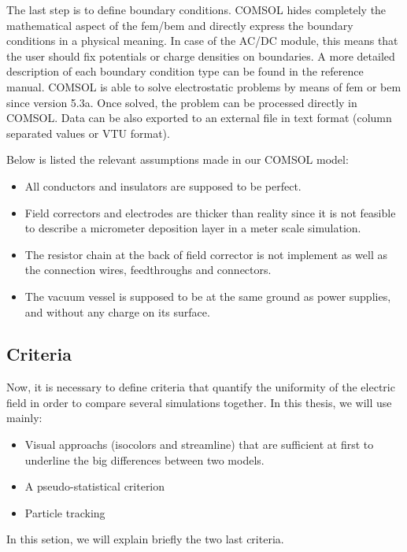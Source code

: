 \begin{refsection}
  

  The last step is to define boundary conditions. COMSOL hides completely the mathematical aspect of the \acrshort{fem}/\acrshort{bem} and directly express the boundary conditions in a physical meaning. In case of the AC/DC module, this means that the user should fix potentials or charge densities on boundaries. A more detailed description of each boundary condition type can be found in the reference manual. COMSOL is able to solve electrostatic problems by means of \acrshort{fem} or \acrshort{bem} since version 5.3a.
  Once solved, the problem can be processed directly in COMSOL. Data can be also exported to an external file in text format (column separated values or VTU format).

  

  Below is listed the relevant assumptions made in our COMSOL model:
  \begin{itemize}
  \item All conductors and insulators are supposed to be perfect. 
  \item Field correctors and electrodes are thicker than reality since it is not feasible to describe a micrometer deposition layer in a meter scale simulation. 
  \item The resistor chain at the back of field corrector is not implement as well as the connection wires, feedthroughs and connectors. 
  \item The vacuum vessel is supposed to be at the same ground as power supplies, and without any charge on its surface.
  \end{itemize}

  \subsection{Criteria}

  Now, it is necessary to define criteria that quantify the uniformity of the electric field in order to compare several simulations together. In this thesis, we will use mainly:
  \begin{itemize}
    \item Visual approachs (isocolors and streamline) that are sufficient at first to underline the big differences between two models.
    \item A pseudo-statistical criterion
    \item Particle tracking
  \end{itemize}
  In this setion, we will explain briefly the two last criteria.


\end{refsection}

